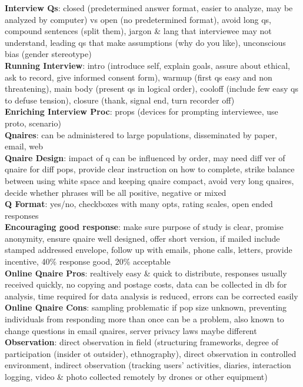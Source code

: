 \documentclass[a4paper]{article}
\begin{document}
\begin{multicols}{3}
        \textbf{Interview Qs}: closed (predetermined answer format, easier to analyze, may be analyzed by computer) vs open (no predetermined format), avoid long qs, compound sentences (split them), jargon \& lang that interviewee may not understand, leading qs that make assumptions (why do you like), unconscious bias (gender stereotype)\\
        \textbf{Running Interview}: intro (introduce self, explain goals, assure about ethical, ask to record, give informed consent form), warmup (first qs easy and non threatening), main body (present qs in logical order), cooloff (include few easy qs to defuse tension), closure (thank, signal end, turn recorder off)\\
        \textbf{Enriching Interview Proc}: props (devices for prompting interviewee, use proto, scenario)\\
        \textbf{Qnaires}: can be administered to large populations, disseminated by paper, email, web\\
        \textbf{Qnaire Design}: impact of q can be influenced by order, may need diff ver of qnaire for diff pops, provide clear instruction on how to complete, strike balance between using white space and keeping qnaire compact, avoid very long qnaires, decide whether phrases will be all positive, negative or mixed\\
        \textbf{Q Format}: yes/no, checkboxes with many opts, rating scales, open ended responses\\
        \textbf{Encouraging good response}: make sure purpose of study is clear, promise anonymity, ensure qnaire well designed, offer short version, if mailed include stamped addressed envelope, follow up with emails, phone calls, letters, provide incentive, 40\% response good, 20\% acceptable\\
        \textbf{Online Qnaire Pros}: realtively easy \& quick to distribute, responses usually received quickly, no copying and postage costs, data can be collected in db for analysis, time required for data analysis is reduced, errors can be corrected easily\\
        \textbf{Online Qnaire Cons}: sampling problematic if pop size unknown, preventing individuals from responding more than once can be a problem, also known to change questions in email qnaires, server privacy laws maybe different\\
        \textbf{Observation}: direct observation in field (structuring frameworks, degree of participation (insider ot outsider), ethnography), direct observation in controlled environment, indirect observation (tracking users' activities, diaries, interaction logging, video \& photo collected remotely by drones or other equipment)\\

\end{multicols}
\end{document}
